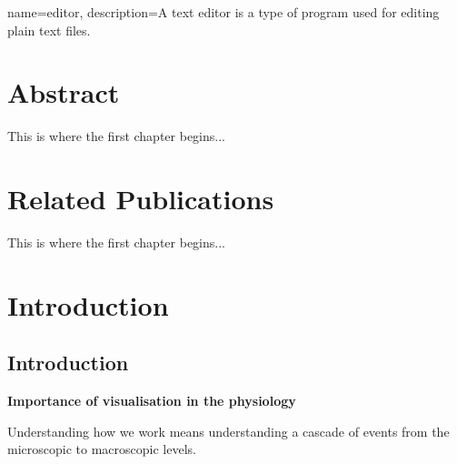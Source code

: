 
{
	name={editor},
	description={A text editor is a type of program used for editing plain text files.}
}

\chapter{Abstract}


This is where the first chapter begins...


\chapter{Related Publications}

This is where the first chapter begins...

\chapter{Introduction}

\section{Introduction}

%
%
%
%
%
%
%


\textbf{Importance of visualisation in the physiology}

Understanding how we work means understanding a cascade of events from the microscopic to macroscopic levels.

